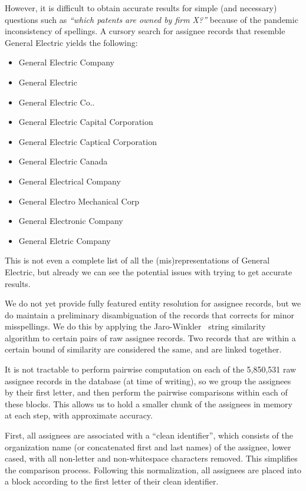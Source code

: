 However, it is difficult to obtain accurate results for simple (and
necessary) questions such as \emph{``which patents are owned by firm
X?''} because of the pandemic inconsistency of spellings. A cursory
search for assignee records that resemble General Electric yields
the following:
\begin{itemize}
\item General Electric Company 
\item General Electric 
\item General Electric Co.. 
\item General Electric Capital Corporation 
\item General Electric Captical Corporation 
\item General Electric Canada 
\item General Electrical Company 
\item General Electro Mechanical Corp 
\item General Electronic Company 
\item General Eletric Company 
\end{itemize}
This is not even a complete list of all the (mis)representations of
General Electric, but already we can see the potential issues with
trying to get accurate results.

We do not yet provide fully featured entity resolution for assignee
records, but we do maintain a preliminary disambiguation of the records
that corrects for minor misspellings. We do this by applying the Jaro-Winkler~\cite{jw}
string similarity algorithm to certain pairs of raw assignee records.
Two records that are within a certain bound of similarity are considered
the same, and are linked together.

It is not tractable to perform pairwise computation on each of the
5,850,531 raw assignee records in the database (at time of writing),
so we group the assignees by their first letter, and then perform
the pairwise comparisons within each of these blocks. This allows
us to hold a smaller chunk of the assignees in memory at each step,
with approximate accuracy.

First, all assignees are associated with a ``clean identifier'', which consists
of the organization name (or concatenated first and last names) of the
assignee, lower cased, with all non-letter and non-whitespace characters
removed. This simplifies the comparison process. Following this normalization,
all assignees are placed into a block according to the first letter of their clean
identifier.

